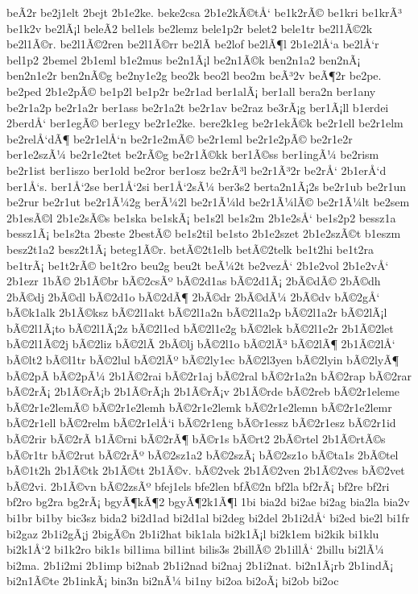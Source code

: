 {beÃ­2r
be2j1elt
2bejt
2b1e2ke.
beke2csa
2b1e2kÃ©tÅ‘
be1k2rÃ©
be1kri
be1krÃ³
be1k2v
be2lÃ¡l
beleÃ­2
bel1els
be2lemz
bele1p2r
belet2
bele1tr
be2l1Ã©2k
be2l1Ã©r.
be2l1Ã©2ren
be2l1Ã©rr
be2lÃ­
be2lof
be2lÃ¶l
2b1e2lÅ‘a
be2lÅ‘r
bel1p2
2bemel
2b1eml
b1e2mus
be2n1Ã¡l
be2n1Ã©k
ben2n1a2
ben2nÃ¡
ben2n1e2r
ben2nÃ©g
be2ny1e2g
beo2k
beo2l
beo2m
beÃ³2v
beÃ¶2r
be2pe.
be2ped
2b1e2pÃ©
be1p2l
be1p2r
be2r1ad
ber1alÃ¡
ber1all
bera2n
ber1any
be2r1a2p
be2r1a2r
ber1ass
be2r1a2t
be2r1av
be2raz
be3rÃ¡g
ber1Ã¡ll
b1erdei
2berdÅ‘
ber1egÃ©
ber1egy
be2r1e2ke.
bere2k1eg
be2r1ekÃ©k
be2r1ell
be2r1elm
be2relÅ‘dÃ¶
be2r1elÅ‘n
be2r1e2mÃ©
be2r1eml
be2r1e2pÃ©
be2r1e2r
ber1e2szÃ¼
be2r1e2tet
be2rÃ©g
be2r1Ã©kk
ber1Ã©ss
ber1ingÃ¼
be2rism
be2r1ist
ber1iszo
ber1old
be2ror
ber1osz
be2rÃ³l
be2r1Ã³2r
be2rÅ‘
2b1erÅ‘d
ber1Å‘s.
ber1Å‘2se
ber1Å‘2si
ber1Å‘2sÃ¼
ber3s2
berta2n1Ã¡2s
be2r1ub
be2r1un
be2rur
be2r1ut
be2r1Ã¼2g
berÃ¼2l
be2r1Ã¼ld
be2r1Ã¼lÃ©
be2r1Ã¼lt
be2sem
2b1esÃ©l
2b1e2sÃ©s
be1ska
be1skÃ¡
be1s2l
be1s2m
2b1e2sÅ‘
be1s2p2
bessz1a
bessz1Ã¡
be1s2ta
2beste
2bestÃ©
be1s2til
be1sto
2b1e2szet
2b1e2szÃ©t
b1eszm
besz2t1a2
besz2t1Ã¡
beteg1Ã©r.
betÃ©2t1elb
betÃ©2telk
be1t2hi
be1t2ra
be1trÃ¡
be1t2rÃ©
be1t2ro
beu2g
beu2t
beÃ¼2t
be2vezÅ‘
2b1e2vol
2b1e2vÅ‘
2b1ezr
1bÃ©
2b1Ã©br
bÃ©2csÃº
bÃ©2d1as
bÃ©2d1Ã¡
2bÃ©dÃ©
2bÃ©dh
2bÃ©dj
2bÃ©dl
bÃ©2d1o
bÃ©2dÃ¶
2bÃ©dr
2bÃ©dÃ¼
2bÃ©dv
bÃ©2gÅ‘
bÃ©k1alk
2b1Ã©ksz
bÃ©2l1akt
bÃ©2l1a2n
bÃ©2l1a2p
bÃ©2l1a2r
bÃ©2lÃ¡l
bÃ©2l1Ã¡to
bÃ©2l1Ã¡2z
bÃ©2l1ed
bÃ©2l1e2g
bÃ©2lek
bÃ©2l1e2r
2b1Ã©2let
bÃ©2l1Ã©2j
bÃ©2liz
bÃ©2lÃ­
2bÃ©lj
bÃ©2l1o
bÃ©2lÃ³
bÃ©2lÃ¶
2b1Ã©2lÅ‘
bÃ©lt2
bÃ©l1tr
bÃ©2lul
bÃ©2lÃº
bÃ©2ly1ec
bÃ©2l3yen
bÃ©2lyin
bÃ©2lyÃ¶
bÃ©2pÃ­
bÃ©2pÃ¼
2b1Ã©2rai
bÃ©2r1aj
bÃ©2ral
bÃ©2r1a2n
bÃ©2rap
bÃ©2rar
bÃ©2rÃ¡
2b1Ã©rÃ¡b
2b1Ã©rÃ¡h
2b1Ã©rÃ¡v
2b1Ã©rde
bÃ©2reb
bÃ©2r1eleme
bÃ©2r1e2lemÃ©
bÃ©2r1e2lemh
bÃ©2r1e2lemk
bÃ©2r1e2lemn
bÃ©2r1e2lemr
bÃ©2r1ell
bÃ©2relm
bÃ©2r1elÅ‘i
bÃ©2r1eng
bÃ©r1essz
bÃ©2r1esz
bÃ©2r1id
bÃ©2rir
bÃ©2rÃ­
b1Ã©rni
bÃ©2rÃ¶
bÃ©r1s
bÃ©rt2
2bÃ©rtel
2b1Ã©rtÃ©s
bÃ©r1tr
bÃ©2rut
bÃ©2rÃº
bÃ©2sz1a2
bÃ©2szÃ¡
bÃ©2sz1o
bÃ©ta1s
2bÃ©tel
bÃ©1t2h
2b1Ã©tk
2b1Ã©tt
2b1Ã©v.
bÃ©2vek
2b1Ã©2ven
2b1Ã©2ves
bÃ©2vet
bÃ©2vi.
2b1Ã©vn
bÃ©2zsÃº
bfej1els
bfe2len
bfÃ©2n
bf2la
bf2rÃ¡
bf2re
bf2ri
bf2ro
bg2ra
bg2rÃ¡
bgyÃ¶kÃ¶2
bgyÃ¶2k1Ã¶l
1bi
bia2d
bi2ae
bi2ag
bia2la
bia2v
bi1br
bi1by
bic3sz
bida2
bi2d1ad
bi2d1al
bi2deg
bi2del
2b1i2dÅ‘
bi2ed
bie2l
bi1fr
bi2gaz
2b1i2gÃ¡j
2bigÃ©n
2b1i2hat
bik1ala
bi2k1Ã¡l
bi2k1em
bi2kik
bi1klu
bi2k1Å‘2
bi1k2ro
bik1s
bil1ima
bil1int
bilis3s
2billÃ©
2b1illÅ‘
2billu
bi2lÃ¼
bi2ma.
2b1i2mi
2b1imp
bi2nab
2b1i2nad
bi2naj
2b1i2nat.
bi2n1Ã¡rb
2b1indÃ¡
bi2n1Ã©te
2b1inkÃ¡
bin3n
bi2nÃ¼
bi1ny
bi2oa
bi2oÃ¡
bi2ob
bi2oc
}
